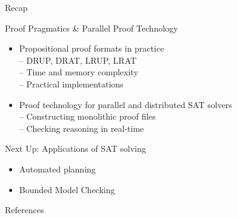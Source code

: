 \documentclass[t,english]{sdqbeamer}
\begin{document}
\begin{frame}{Recap}
	\begin{blueblock}{Proof Pragmatics \& Parallel Proof Technology}
		\begin{itemize}\setlength{\itemsep}{1ex}
			\item Propositional proof formats in practice
			\\-- DRUP, DRAT, LRUP, LRAT
			\\-- Time and memory complexity
			\\-- Practical implementations
			\item Proof technology for parallel and distributed SAT solvers
			\\-- Constructing monolithic proof files
			\\-- Checking reasoning in real-time
		\end{itemize}
	\end{blueblock}
	
	\begin{block}{Next Up: Applications of SAT solving}
		\begin{itemize}
			\item Automated planning
			\item Bounded Model Checking
		\end{itemize}
	\end{block}
\end{frame}


\begin{frame}[allowframebreaks]{References}
	\renewcommand*{\bibfont}{\footnotesize}
	\printbibliography[heading=subbibliography]
\end{frame}
\end{document}
